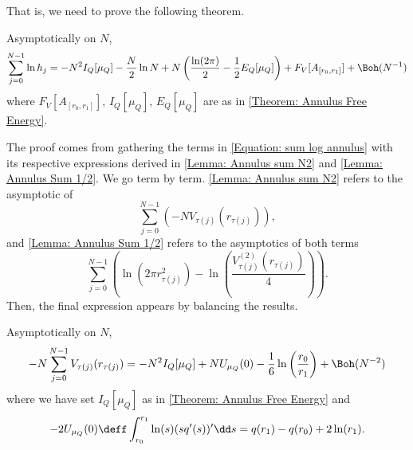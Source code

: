 That is, we need to prove the following theorem.

\begin{teorema}			\label{Theorem: Annulus sum}
	Asymptotically on $N$,
	\begin{equation}
		\sum_{j=0}^{N-1} \ln{h_j} = - N^2 I_Q[\mu_Q] - \frac{N}{2} \ln N + N \left(\frac{\ln(2\pi)}{2} - \frac{1}{2} E_Q[\mu_Q]\right) + F_V[A_{[r_0, r_1]}] + \Boh(N^{-1}) 
	\end{equation}
	where $F_V[A_{[r_0, r_1]}]$, $I_Q[\mu_Q]$, $	E_Q[\mu_Q]$ are as in \autoref{Theorem: Annulus Free Energy}.
\end{teorema}

The proof comes from gathering the terms in \eqref{Equation: sum log annulus} with its respective expressions derived in \autoref{Lemma: Annulus sum N2} and \autoref{Lemma: Annulus Sum 1/2}. We go term by term. \autoref{Lemma: Annulus sum N2} refers to the asymptotic of 
\begin{equation}
	\sum_{j=0}^{N-1} \left(-N V_{\tau(j)}(r_{\tau(j)})\right),
\end{equation}
and \autoref{Lemma: Annulus Sum 1/2} refers to the asymptotics of both terms 
\begin{equation}
	\sum_{j=0}^{N-1}\left(\ln(2\pi r^2_{\tau(j)}) - \ln\left(\frac{V^{(2)}_{\tau(j)}(r_{\tau(j)})}{4}\right)\right).
\end{equation}
Then, the final expression appears by balancing the results.

\begin{lema} 	\label{Lemma: Annulus sum N2}
	Asymptotically on $N$,
	\begin{equation}
		- N \sum_{j=0}^{N-1} V_{\tau(j)}(r_{\tau(j)}) = - N^2 I_Q[\mu_Q] + N U_{\mu_Q}(0) - \frac{1}{6} \ln{\left( \frac{r_0}{r_1}\right)} + \Boh(N^{-2})
		\label{Equation: sum V annulus}
	\end{equation}
	where we have set $I_Q[\mu_Q]$ as in \autoref{Theorem: Annulus Free Energy} and
	\begin{equation}
		- 2 U_{\mu_Q}(0) \deff \int_{r_0}^{r_1} \ln(s) (s q'(s))' \dd s  = q(r_1) - q(r_0) + 2 \ln(r_1).
	\end{equation}
\end{lema}
	
